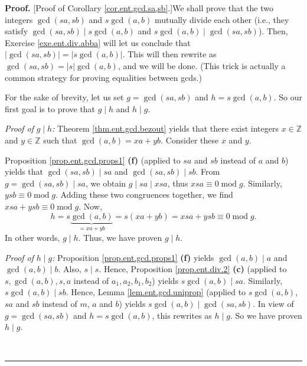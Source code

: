 \documentclass[numbers=enddot,12pt,final,onecolumn,notitlepage]{scrartcl}%
\numberwithin{exer}{subsection}
\theoremstyle{definition}
\newenvironment{proof}[1][Proof]{\noindent\textbf{#1.} }{\ \rule{0.5em}{0.5em}}
\begin{document}
\begin{proof}
[Proof of Corollary \ref{cor.ent.gcd.sa,sb}.]We shall prove that the two
integers $\gcd\left(  sa,sb\right)  $ and $s\gcd\left(  a,b\right)  $ mutually
divide each other (i.e., they satisfy $\gcd\left(  sa,sb\right)  \mid
s\gcd\left(  a,b\right)  $ and $s\gcd\left(  a,b\right)  \mid\gcd\left(
sa,sb\right)  $). Then, Exercise \ref{exe.ent.div.abba} will let us conclude
that $\left\vert \gcd\left(  sa,sb\right)  \right\vert =\left\vert
s\gcd\left(  a,b\right)  \right\vert $. This will then rewrite as $\gcd\left(
sa,sb\right)  =\left\vert s\right\vert \gcd\left(  a,b\right)  $, and we will
be done. (This trick is actually a common strategy for proving equalities
between gcds.)

For the sake of brevity, let us set $g=\gcd\left(  sa,sb\right)  $ and
$h=s\gcd\left(  a,b\right)  $. So our first goal is to prove that $g\mid h$
and $h\mid g$.

\textit{Proof of }$g\mid h$\textit{:} Theorem \ref{thm.ent.gcd.bezout} yields
that there exist integers $x\in\mathbb{Z}$ and $y\in\mathbb{Z}$ such that
$\gcd\left(  a,b\right)  =xa+yb$. Consider these $x$ and $y$.

Proposition \ref{prop.ent.gcd.props1} \textbf{(f)} (applied to $sa$ and $sb$
instead of $a$ and $b$) yields that $\gcd\left(  sa,sb\right)  \mid sa$ and
$\gcd\left(  sa,sb\right)  \mid sb$. From $g=\gcd\left(  sa,sb\right)  \mid
sa$, we obtain $g\mid sa\mid xsa$, thus $xsa\equiv0\operatorname{mod}g$.
Similarly, $ysb\equiv0\operatorname{mod}g$. Adding these two congruences
together, we find $xsa+ysb\equiv0\operatorname{mod}g$. Now,%
\[
h=s\underbrace{\gcd\left(  a,b\right)  }_{=xa+yb}=s\left(  xa+yb\right)
=xsa+ysb\equiv0\operatorname{mod}g.
\]
In other words, $g\mid h$. Thus, we have proven $g\mid h$.

\textit{Proof of }$h\mid g$\textit{:} Proposition \ref{prop.ent.gcd.props1}
\textbf{(f)} yields $\gcd\left(  a,b\right)  \mid a$ and $\gcd\left(
a,b\right)  \mid b$. Also, $s\mid s$. Hence, Proposition \ref{prop.ent.div.2}
\textbf{(c)} (applied to $s,\gcd\left(  a,b\right)  ,s,a$ instead of
$a_{1},a_{2},b_{1},b_{2}$) yields $s\gcd\left(  a,b\right)  \mid sa$.
Similarly, $s\gcd\left(  a,b\right)  \mid sb$. Hence, Lemma
\ref{lem.ent.gcd.uniprop} (applied to $s\gcd\left(  a,b\right)  $, $sa$ and
$sb$ instead of $m$, $a$ and $b$) yields $s\gcd\left(  a,b\right)  \mid
\gcd\left(  sa,sb\right)  $. In view of $g=\gcd\left(  sa,sb\right)  $ and
$h=s\gcd\left(  a,b\right)  $, this rewrites as $h\mid g$. So we have proven
$h\mid g$.


\end{proof}
\end{document}
